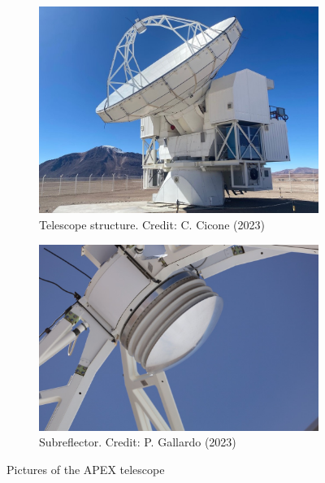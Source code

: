 \begin{figure}[H]
    \centering
    \begin{subfigure}[t]{0.49\textwidth}
        \centering
        \includegraphics[width=\textwidth]{Astronomy/apex_primary_mirror_cropped.jpeg}
        \caption{Telescope structure. Credit: C. Cicone (2023)}
        \label{subfig:apex_primary}
    \end{subfigure}
    \hfill
    \begin{subfigure}[t]{0.49\textwidth}
       \centering
       \includegraphics[width=\textwidth]{Astronomy/apex_subreflector.jpeg}
       \caption{Subreflector. Credit: P. Gallardo (2023)}
       \label{subfig:apex_subref}
    \end{subfigure}
    \caption{Pictures of the APEX telescope}
    \label{fig:apex_images}
\end{figure}

